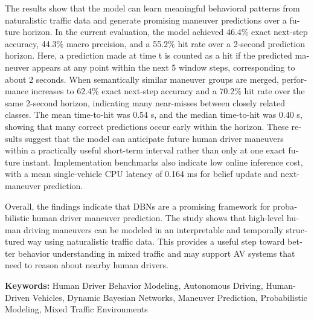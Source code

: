 \begin{otherlanguage}{english}
\par The results show that the model can learn meaningful behavioral patterns from naturalistic traffic data and generate promising maneuver predictions over a future horizon.  
In the current evaluation, the model achieved 46.4\% exact next-step accuracy, 44.3\% macro precision, and a 55.2\% hit rate over a 2-second prediction horizon. 
Here, a prediction made at time t is counted as a hit if the predicted maneuver appears at any point within the next 5 window steps, corresponding to about 2 seconds. 
When semantically similar maneuver groups are merged, performance increases to 62.4\% exact next-step accuracy and a 70.2\% hit rate over the same 2-second horizon, 
indicating many near-misses between closely related classes. 
The mean time-to-hit was 0.54 s, and the median time-to-hit was 0.40 s, showing that many correct predictions occur early within the horizon. These results suggest that 
the model can anticipate future human driver maneuvers within a practically useful short-term interval rather than only at one exact future instant. Implementation benchmarks 
also indicate low online inference cost, with a mean single-vehicle \ac{CPU} latency of 0.164 ms for belief update and next-maneuver prediction.

\par Overall, the findings indicate that \acp{DBN} are a promising framework for probabilistic human driver maneuver prediction. The study shows that high-level human driving 
maneuvers can be modeled in an interpretable and temporally structured way using naturalistic traffic data. This provides a useful step toward better behavior understanding in 
mixed traffic and may support \ac{AV} systems that need to reason about nearby human drivers.


\vfill
\noindent\textbf{Keywords:} Human Driver Behavior Modeling, Autonomous Driving, Human-Driven Vehicles, Dynamic Bayesian Networks, Maneuver Prediction, Probabilistic 
Modeling, Mixed Traffic Environments
\vfill
\end{otherlanguage}